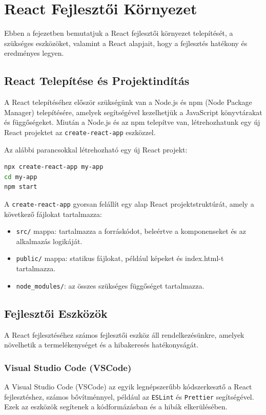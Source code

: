 \documentclass[colorlinks]{thesis-kando}
\theoremstyle{definition}
\theoremstyle{remark}
\begin{document}
\section{React Fejlesztői Környezet}
Ebben a fejezetben bemutatjuk a React fejlesztői környezet telepítését, a szükséges eszközöket, valamint a React alapjait, hogy a fejlesztés hatékony és eredményes legyen.

\subsection{React Telepítése és Projektindítás}
A React telepítéséhez először szükségünk van a Node.js és npm (Node Package Manager) telepítésére, amelyek segítségével kezelhetjük a JavaScript könyvtárakat és függőségeket. Miután a Node.js és az npm telepítve van, létrehozhatunk egy új React projektet az \texttt{create-react-app} eszközzel.

Az alábbi parancsokkal létrehozható egy új React projekt:
\begin{lstlisting}[language=bash]
npx create-react-app my-app
cd my-app
npm start
\end{lstlisting}

\pagebreak

A \texttt{create-react-app} gyorsan felállít egy alap React projektstruktúrát, amely a következő fájlokat tartalmazza:
\begin{itemize}
    \item \texttt{src/} mappa: tartalmazza a forráskódot, beleértve a komponenseket és az alkalmazás logikáját.
    \item \texttt{public/} mappa: statikus fájlokat, például képeket és index.html-t tartalmazza.
    \item \texttt{node\_modules/}: az összes szükséges függőséget tartalmazza.
\end{itemize}

\subsection{Fejlesztői Eszközök}
A React fejlesztéséhez számos fejlesztői eszköz áll rendelkezésünkre, amelyek növelhetik a termelékenységet és a hibakeresés hatékonyságát.

\subsubsection{Visual Studio Code (VSCode)}
A Visual Studio Code (VSCode) az egyik legnépszerűbb kódszerkesztő a React fejlesztéshez, számos bővítménnyel, például az \texttt{ESLint} és \texttt{Prettier} segítségével. Ezek az eszközök segítenek a kódformázásban és a hibák elkerülésében.
\end{document}
